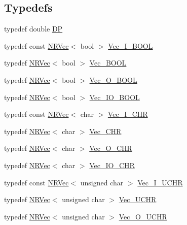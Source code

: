 \subsection*{Typedefs}
\begin{DoxyCompactItemize}
\item 
typedef double \mbox{\hyperlink{namespaceNR_af6ff762dd605ff477b8e52387253a02a}{DP}}
\item 
typedef const \mbox{\hyperlink{classNR_1_1NRVec}{N\+R\+Vec}}$<$ bool $>$ \mbox{\hyperlink{namespaceNR_a70331f3de2cf735819b5719e4048d7f3}{Vec\+\_\+\+I\+\_\+\+B\+O\+OL}}
\item 
typedef \mbox{\hyperlink{classNR_1_1NRVec}{N\+R\+Vec}}$<$ bool $>$ \mbox{\hyperlink{namespaceNR_a724646cb87fce7f489384b9a113515fd}{Vec\+\_\+\+B\+O\+OL}}
\item 
typedef \mbox{\hyperlink{classNR_1_1NRVec}{N\+R\+Vec}}$<$ bool $>$ \mbox{\hyperlink{namespaceNR_a7978b7ffdafb07629b4165a7be29d1d5}{Vec\+\_\+\+O\+\_\+\+B\+O\+OL}}
\item 
typedef \mbox{\hyperlink{classNR_1_1NRVec}{N\+R\+Vec}}$<$ bool $>$ \mbox{\hyperlink{namespaceNR_ab48f823aa1c29bd5b75b57ca8b6f7eb5}{Vec\+\_\+\+I\+O\+\_\+\+B\+O\+OL}}
\item 
typedef const \mbox{\hyperlink{classNR_1_1NRVec}{N\+R\+Vec}}$<$ char $>$ \mbox{\hyperlink{namespaceNR_a7083dedcad2ce48148f379b9937b1a30}{Vec\+\_\+\+I\+\_\+\+C\+HR}}
\item 
typedef \mbox{\hyperlink{classNR_1_1NRVec}{N\+R\+Vec}}$<$ char $>$ \mbox{\hyperlink{namespaceNR_a8bdd7b71b3ea3283f23eed0cfabaf38c}{Vec\+\_\+\+C\+HR}}
\item 
typedef \mbox{\hyperlink{classNR_1_1NRVec}{N\+R\+Vec}}$<$ char $>$ \mbox{\hyperlink{namespaceNR_a12f1014df3e5efa305fbf80c51c707b5}{Vec\+\_\+\+O\+\_\+\+C\+HR}}
\item 
typedef \mbox{\hyperlink{classNR_1_1NRVec}{N\+R\+Vec}}$<$ char $>$ \mbox{\hyperlink{namespaceNR_a7486678c75d124d88a5ad22efbcd737e}{Vec\+\_\+\+I\+O\+\_\+\+C\+HR}}
\item 
typedef const \mbox{\hyperlink{classNR_1_1NRVec}{N\+R\+Vec}}$<$ unsigned char $>$ \mbox{\hyperlink{namespaceNR_ace0fbcd7daadfbf5e4e7db2a317a5b46}{Vec\+\_\+\+I\+\_\+\+U\+C\+HR}}
\item 
typedef \mbox{\hyperlink{classNR_1_1NRVec}{N\+R\+Vec}}$<$ unsigned char $>$ \mbox{\hyperlink{namespaceNR_a75ba1edf4fe4133a3ecb94b7c1a90f20}{Vec\+\_\+\+U\+C\+HR}}
\item 
typedef \mbox{\hyperlink{classNR_1_1NRVec}{N\+R\+Vec}}$<$ unsigned char $>$ \mbox{\hyperlink{namespaceNR_ac322e5f1208609bf101390ed2495b7d5}{Vec\+\_\+\+O\+\_\+\+U\+C\+HR}}

\end{DoxyCompactItemize}
